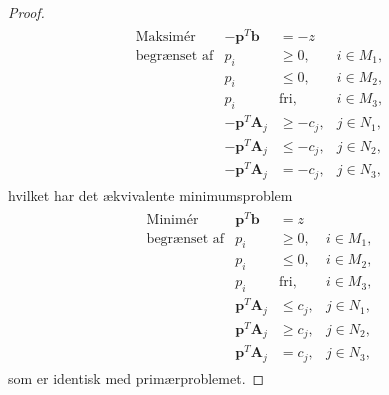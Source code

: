 \begin{proof}
\begin{align*}
\begin{array}{lrll}
\text{Maksimér}		&-\textbf{p}^T\textbf{b}	&=-z		&\\
\text{begrænset af}	&p_i					&\geq 0,	&i \in M_1,\\
					&p_i					&\leq 0,	&i \in M_2,\\
					&p_i					&\text{fri},	&i \in M_3,\\
					&-\textbf{p}^T\textbf{A}_j	&\geq -c_j,	&j \in N_1,\\
					&-\textbf{p}^T\textbf{A}_j	&\leq -c_j,	&j \in N_2,\\
					&-\textbf{p}^T\textbf{A}_j	& = -c_j,	&j \in N_3,
\end{array}
\end{align*}
%
hvilket har det ækvivalente minimumsproblem
%
\begin{align*}
\begin{array}{lrll}
\text{Minimér}		&\textbf{p}^T\textbf{b}	&=z			&\\
\text{begrænset af}	&p_i					&\geq 0,	&i \in M_1,\\
					&p_i					&\leq 0,	&i \in M_2,\\
					&p_i					&\text{fri},	&i \in M_3,\\
					&\textbf{p}^T\textbf{A}_j	&\leq c_j,	&j \in N_1,\\
					&\textbf{p}^T\textbf{A}_j	&\geq c_j,	&j \in N_2,\\
					&\textbf{p}^T\textbf{A}_j	& = c_j,	&j \in N_3,
\end{array}
\end{align*}
%
som er identisk med primærproblemet. 
%
\end{proof}
%
